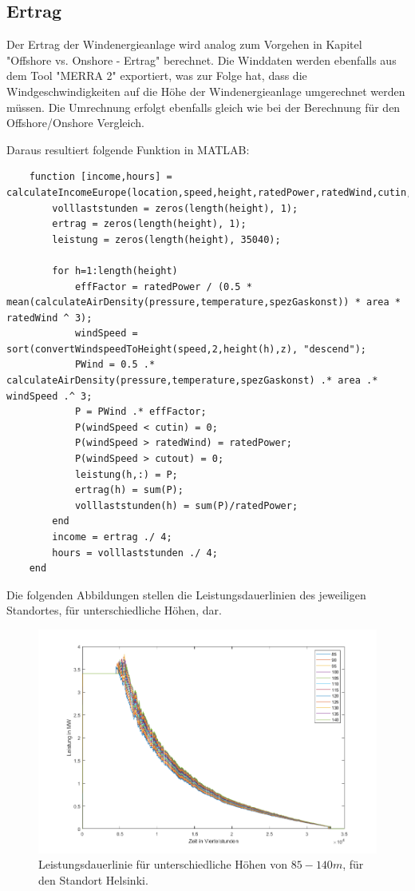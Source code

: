 \documentclass[a4paper,12pt]{article}
\begin{document}
	\subsection{Ertrag}
	Der Ertrag der Windenergieanlage wird analog zum Vorgehen in Kapitel "Offshore vs. Onshore - Ertrag" berechnet.\newline
	Die Winddaten werden ebenfalls aus dem Tool "MERRA 2" exportiert, was zur Folge hat, dass die Windgeschwindigkeiten auf die Höhe der Windenergieanlage umgerechnet werden müssen. Die Umrechnung erfolgt ebenfalls gleich wie bei der Berechnung für den Offshore/Onshore Vergleich.\\ \par
	\noindent Daraus resultiert folgende Funktion in MATLAB:
	\begin{lstlisting}
	function [income,hours] = calculateIncomeEurope(location,speed,height,ratedPower,ratedWind,cutin,cutout,pressure,temperature,area,z,spezGaskonst)
		volllaststunden = zeros(length(height), 1);
		ertrag = zeros(length(height), 1);
		leistung = zeros(length(height), 35040);
	
		for h=1:length(height)
			effFactor = ratedPower / (0.5 * mean(calculateAirDensity(pressure,temperature,spezGaskonst)) * area * ratedWind ^ 3);
			windSpeed = sort(convertWindspeedToHeight(speed,2,height(h),z), "descend");
			PWind = 0.5 .* calculateAirDensity(pressure,temperature,spezGaskonst) .* area .* windSpeed .^ 3;
			P = PWind .* effFactor;
			P(windSpeed < cutin) = 0;
			P(windSpeed > ratedWind) = ratedPower;
			P(windSpeed > cutout) = 0;
			leistung(h,:) = P;
			ertrag(h) = sum(P);
			volllaststunden(h) = sum(P)/ratedPower;
		end
		income = ertrag ./ 4;
		hours = volllaststunden ./ 4;
	end
	\end{lstlisting}
	Die folgenden Abbildungen stellen die Leistungsdauerlinien des jeweiligen Standortes, für unterschiedliche Höhen, dar.
	\begin{figure}[H]
		\centering
		\includegraphics[width=12cm]{img/results/LeistungsdauerlinieHelsinki}
		\caption{Leistungsdauerlinie für unterschiedliche Höhen von $85 - 140m$, für den Standort Helsinki.}
	\end{figure}
\end{document}
